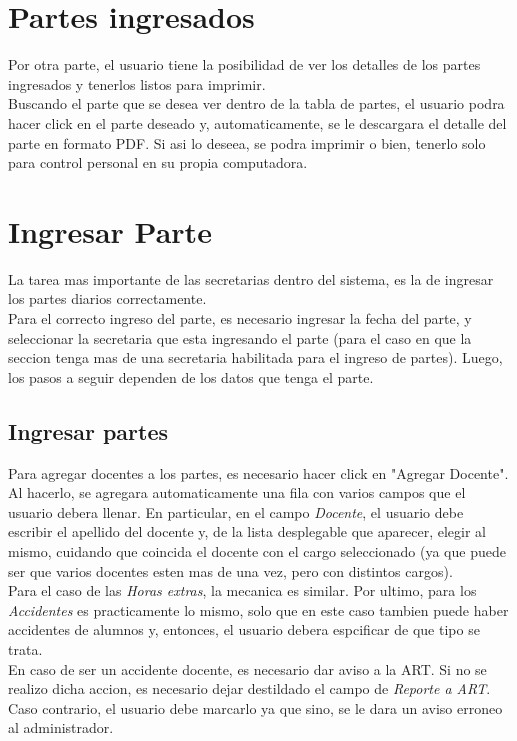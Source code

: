 \documentclass[12pt,a4paper]{article}
\begin{document}
\section{Partes ingresados}
Por otra parte, el usuario tiene la posibilidad de ver los detalles de los partes ingresados y tenerlos listos para imprimir. \\
Buscando el parte que se desea ver dentro de la tabla de partes, el usuario podra hacer click en el parte deseado y, automaticamente, se le descargara el detalle del parte en formato PDF. Si asi lo deseea, se podra imprimir o bien, tenerlo solo para control personal en su propia computadora.

\section{Ingresar Parte}
La tarea mas importante de las secretarias dentro del sistema, es la de ingresar los partes diarios correctamente. \\
Para el correcto ingreso del parte, es necesario ingresar la fecha del parte, y seleccionar la secretaria que esta ingresando el parte (para el caso en que la seccion tenga mas de una secretaria habilitada para el ingreso de partes). Luego, los pasos a seguir dependen de los datos que tenga el parte. 
\subsection{Ingresar partes}
Para agregar docentes a los partes, es necesario hacer click en "Agregar Docente". Al hacerlo, se agregara automaticamente una fila con varios campos que el usuario debera llenar. En particular, en el campo \textit{Docente}, el usuario debe escribir el apellido del docente y, de la lista desplegable que aparecer, elegir al mismo, cuidando que coincida el docente con el cargo seleccionado (ya que puede ser que varios docentes esten mas de una vez, pero con distintos cargos). \\
Para el caso de las \textit{Horas extras}, la mecanica es similar. Por ultimo, para los \textit{Accidentes} es practicamente lo mismo, solo que en este caso tambien puede haber accidentes de alumnos y, entonces, el usuario debera espcificar de que tipo se trata. \\
En caso de ser un accidente docente, es necesario dar aviso a la ART. Si no se realizo dicha accion, es necesario dejar destildado el campo de \textit{Reporte a ART}. Caso contrario, el usuario debe marcarlo ya que sino, se le dara un aviso erroneo al administrador.
\end{document}
